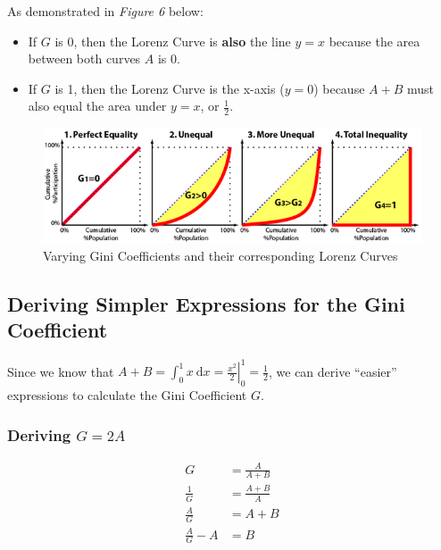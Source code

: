 \documentclass[
  letterpaper,
  DIV=11,
  numbers=noendperiod]{scrartcl}
\providecommand{\tightlist}{%
  \setlength{\itemsep}{0pt}\setlength{\parskip}{0pt}}\usepackage{longtable,booktabs,array}
\begin{document}
As demonstrated in \emph{Figure 6} below:

\begin{itemize}
\tightlist
\item
  If \(G\) is 0, then the Lorenz Curve is \textbf{also} the line \(y=x\)
  because the area between both curves \(A\) is 0.
\item
  If \(G\) is 1, then the Lorenz Curve is the x-axis (\(y=0\)) because
  \(A+B\) must also equal the area under \(y=x\), or \(\frac{1}{2}\).
\end{itemize}

\begin{figure}[H]

{\centering \includegraphics[width=1\textwidth,height=\textheight]{img/varying-gini.png}

}

\caption{Varying Gini Coefficients and their corresponding Lorenz
Curves}

\end{figure}%

\subsection{Deriving Simpler Expressions for the Gini
Coefficient}\label{deriving-simpler-expressions-for-the-gini-coefficient}

Since we know that
\(A+B = \int_{0}^{1} x \ \mathrm{d}x = \left.\frac{x^2}{2}\right\vert_{0}^{1} = \frac{1}{2}\),
we can derive ``easier'' expressions to calculate the Gini Coefficient
\(G\).

\subsubsection{\texorpdfstring{Deriving
\(G=2A\)}{Deriving G=2A}}\label{deriving-g2a}

\begin{align}
G &= \frac{A}{A+B}\tag{Initial Gini Coefficient formula} \\
\frac{1}{G} &= \frac{A+B}{A}\tag{Reciprocate} \\
\frac{A}{G} &= A+B\tag{Multiply by $A$} \\
\frac{A}{G}-A &= B\tag{Subtract $A$}
\end{align}
\end{document}
